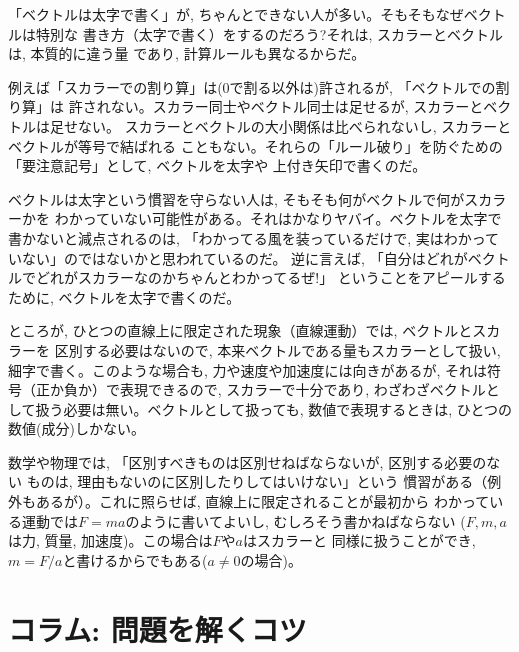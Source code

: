 {\small 「ベクトルは太字で書く」が, ちゃんとできない人が多い。そもそもなぜベクトルは特別な
書き方（太字で書く）をするのだろう?それは, スカラーとベクトルは, 本質的に違う量
であり, 計算ルールも異なるからだ。

例えば「スカラーでの割り算」は(0で割る以外は)許されるが, 「ベクトルでの割り算」は
許されない。スカラー同士やベクトル同士は足せるが, スカラーとベクトルは足せない。
スカラーとベクトルの大小関係は比べられないし, スカラーとベクトルが等号で結ばれる
こともない。それらの「ルール破り」を防ぐための「要注意記号」として, ベクトルを太字や
上付き矢印で書くのだ。

ベクトルは太字という慣習を守らない人は, そもそも何がベクトルで何がスカラーかを
わかっていない可能性がある。それはかなりヤバイ。ベクトルを太字で書かないと減点されるのは, 
「わかってる風を装っているだけで, 実はわかっていない」のではないかと思われているのだ。
逆に言えば, 「自分はどれがベクトルでどれがスカラーなのかちゃんとわかってるぜ!」
ということをアピールするために, ベクトルを太字で書くのだ。

ところが, ひとつの直線上に限定された現象（直線運動）では, ベクトルとスカラーを
区別する必要はないので, 本来ベクトルである量もスカラーとして扱い, 
細字で書く。このような場合も, 力や速度や加速度には向きがあるが, 
それは符号（正か負か）で表現できるので, スカラーで十分であり, 
わざわざベクトルとして扱う必要は無い。ベクトルとして扱っても, 
数値で表現するときは, ひとつの数値(成分)しかない。

数学や物理では, 「区別すべきものは区別せねばならないが, 区別する必要のない
ものは, 理由もないのに区別したりしてはいけない」という
慣習がある（例外もあるが）。これに照らせば, 直線上に限定されることが最初から
わかっている運動では$F=ma$のように書いてよいし, むしろそう書かねばならない
($F, m, a$は力, 質量, 加速度)。この場合は$F$や$a$はスカラーと
同様に扱うことができ, $m=F/a$と書けるからでもある($a\neq 0$の場合)。\\}


\section*{コラム: 問題を解くコツ}

